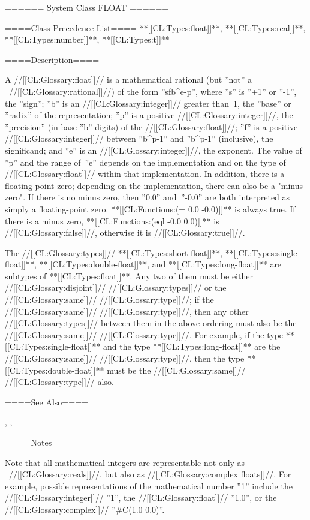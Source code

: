 ====== System Class FLOAT ======

====Class Precedence List==== **[[CL:Types:float]]**, **[[CL:Types:real]]**, **[[CL:Types:number]]**, **[[CL:Types:t]]**

====Description====

A //[[CL:Glossary:float]]// is a mathematical rational (but ''not'' a \clisp\ //[[CL:Glossary:rational]]//) of the form ''s\cdot f\cdot b^{e-p}'', where ''s'' is ''+1'' or ''-1'', the ''sign''; ''b'' is an //[[CL:Glossary:integer]]// greater than~1, the ''base'' or ''radix'' of the representation; ''p'' is a positive //[[CL:Glossary:integer]]//, the ''precision'' (in base-''b'' digits) of the //[[CL:Glossary:float]]//; ''f'' is a positive //[[CL:Glossary:integer]]// between ''b^{p-1}'' and ''b^p-1'' (inclusive), the significand; and ''e'' is an //[[CL:Glossary:integer]]//, the exponent. The value of ''p'' and the range of~''e'' depends on the implementation and on the type of //[[CL:Glossary:float]]// within that implementation. In addition, there is a floating-point zero; depending on the implementation, there can also be a "minus zero". If there is no minus zero, then ''0.0'' and~''-0.0'' are both interpreted as simply a floating-point zero. **[[CL:Functions:(= 0.0 -0.0)]]** is always true. If there is a minus zero, **[[CL:Functions:(eql -0.0 0.0)]]** is //[[CL:Glossary:false]]//, otherwise it is //[[CL:Glossary:true]]//.



The //[[CL:Glossary:types]]// **[[CL:Types:short-float]]**, **[[CL:Types:single-float]]**, **[[CL:Types:double-float]]**, and **[[CL:Types:long-float]]** are subtypes of **[[CL:Types:float]]**. Any two of them must be either //[[CL:Glossary:disjoint]]// //[[CL:Glossary:types]]// or the //[[CL:Glossary:same]]// //[[CL:Glossary:type]]//; if the //[[CL:Glossary:same]]// //[[CL:Glossary:type]]//, then any other //[[CL:Glossary:types]]// between them in the above ordering must also be the //[[CL:Glossary:same]]// //[[CL:Glossary:type]]//. For example, if the type **[[CL:Types:single-float]]** and the type **[[CL:Types:long-float]]** are the //[[CL:Glossary:same]]// //[[CL:Glossary:type]]//, then the type **[[CL:Types:double-float]]** must be the //[[CL:Glossary:same]]// //[[CL:Glossary:type]]// also.


====See Also====

{\figref\SyntaxForNumericTokens}, {\secref\NumsFromTokens}, {\secref\PrintingFloats}

====Notes====

Note that all mathematical integers are representable not only as \clisp\ //[[CL:Glossary:reals]]//, but also as //[[CL:Glossary:complex floats]]//. For example, possible representations of the mathematical number ''1'' include the //[[CL:Glossary:integer]]// ''1'', the //[[CL:Glossary:float]]// ''1.0'', or the //[[CL:Glossary:complex]]// ''#C(1.0 0.0)''.

